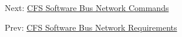 Next\-: \hyperlink{cfssbncmds}{C\-F\-S Software Bus Network Commands} \par
 Prev\-: \hyperlink{cfssbnreq}{C\-F\-S Software Bus Network Requirements} 